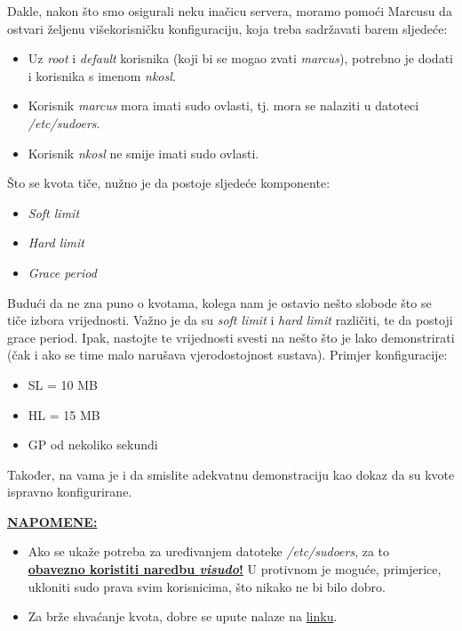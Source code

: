 \documentclass[12pt,a4paper]{article}
\begin{document}
		\par Dakle, nakon što smo osigurali neku inačicu servera, moramo pomoći Marcusu da ostvari željenu višekorisničku konfiguraciju, koja treba sadržavati barem sljedeće:
		\begin{itemize}
			\item Uz \textit{root} i \textit{default} korisnika (koji bi se mogao zvati \textit{marcus}), potrebno je dodati i korisnika s imenom \textit{nkosl}.
			\item Korisnik \textit{marcus} mora imati sudo ovlasti, tj. mora se nalaziti u datoteci \textit{/etc/sudoers}. 
			\item Korisnik \textit{nkosl} ne smije imati sudo ovlasti.
		\end{itemize}

		Što se kvota tiče, nužno je da postoje sljedeće komponente:
		\begin{itemize}
			\item \textit{Soft limit}
			\item \textit{Hard limit}
			\item \textit{Grace period}
		\end{itemize}
		Budući da ne zna puno o kvotama, kolega nam je ostavio nešto slobode što se tiče izbora vrijednosti. Važno je da su \textit{soft limit} i \textit{hard limit} različiti, te da postoji grace period. Ipak, nastojte te vrijednosti svesti na nešto što je lako demonstrirati (čak i ako se time malo narušava vjerodostojnost sustava). Primjer konfiguracije:
		\begin{itemize}
			\item SL = 10 MB
			\item HL = 15 MB
			\item GP od nekoliko sekundi
		\end{itemize}
		Također, na vama je i da smislite adekvatnu demonstraciju kao dokaz da su kvote ispravno konfigurirane.
		\vfill

		\textbf{\underline{NAPOMENE:}}
	  	\begin{itemize}
	  		\item Ako se ukaže potreba za uređivanjem datoteke \textit{/etc/sudoers}, za to \\ \textbf{\underline{obavezno koristiti naredbu \textit{visudo}!}} U protivnom je moguće, primjerice, ukloniti sudo prava svim korisnicima, što nikako ne bi bilo dobro.
	  		\item Za brže shvaćanje kvota, dobre se upute nalaze na \href{https://www.digitalocean.com/community/tutorials/how-to-enable-user-and-group-quotas}{linku}.
	  	\end{itemize}
\end{document}
